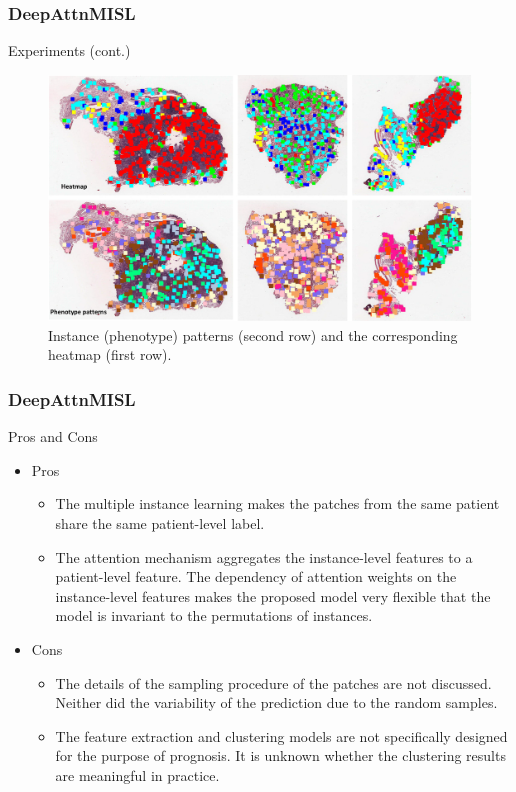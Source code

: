 \documentclass{beamer}
\begin{document}
	\begin{frame}
		\frametitle{DeepAttnMISL}
		Experiments (cont.)
		
		\begin{figure}[H]
			\centering
			\includegraphics[scale=0.13]{figures/heat2.png}
			\caption{Instance (phenotype) patterns (second row) and the corresponding heatmap (first row).}
			\label{fig:heat2}
		\end{figure}
	\end{frame}
	
	\begin{frame}
		\frametitle{DeepAttnMISL}
		Pros and Cons
		\begin{itemize}
			\item Pros
			\begin{itemize}
				\item The multiple instance learning makes the patches from the same patient share the same patient-level label.
				\item The attention mechanism aggregates the instance-level features to a patient-level feature. The dependency of attention weights on the instance-level features makes the proposed model very flexible that the model is invariant to the permutations of instances.  
			\end{itemize}
			\item Cons
			\begin{itemize}
				\item The details of the sampling procedure of the patches are not discussed. Neither did the variability of the prediction due to the random samples.
				\item The feature extraction and clustering models are not specifically designed for the purpose of prognosis. It is unknown whether the clustering results are meaningful in practice.
			\end{itemize}
		\end{itemize}
	\end{frame}
	
\end{document}
